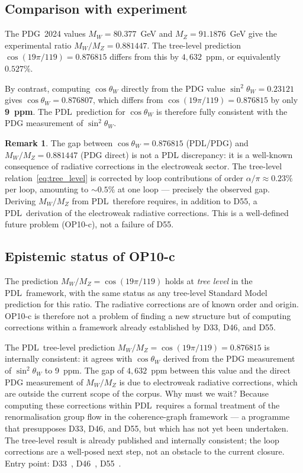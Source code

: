 \documentclass[12pt,a4paper]{article}
\newenvironment{waitbox}[1][]{%
  \begin{tcolorbox}[waitstyle,title={#1}]}{\end{tcolorbox}}
\theoremstyle{definition}
\newtheorem{remark}[theorem]{Remark}
\newcommand{\PDL}{\textsc{PDL}}
\newcommand{\thetaW}{\theta_W}
\newcommand{\sinW}{\sin^2\!\thetaW}
\begin{document}
\subsection{Comparison with experiment}

The PDG~2024 values $M_W = 80.377$~GeV and $M_Z = 91.1876$~GeV give the experimental ratio $M_W/M_Z = 0.881447$. The tree-level prediction $\cos(19\pi/119) = 0.876815$ differs from this by $4{,}632$~ppm, or equivalently $0.527\%$.

By contrast, computing $\cos\thetaW$ directly from the PDG value $\sinW = 0.23121$ gives $\cos\thetaW = 0.876807$, which differs from $\cos(19\pi/119) = 0.876815$ by only \textbf{9~ppm}. The \PDL\ prediction for $\cos\thetaW$ is therefore fully consistent with the PDG measurement of $\sinW$.

\begin{remark}
The gap between $\cos\thetaW = 0.876815$ (PDL/PDG) and $M_W/M_Z = 0.881447$ (PDG direct) is not a PDL discrepancy: it is a well-known consequence of radiative corrections in the electroweak sector. The tree-level relation~\eqref{eq:tree_level} is corrected by loop contributions of order $\alpha / \pi \approx 0.23\%$ per loop, amounting to $\sim 0.5\%$ at one loop --- precisely the observed gap. Deriving $M_W/M_Z$ from \PDL\ therefore requires, in addition to D55, a \PDL\ derivation of the electroweak radiative corrections. This is a well-defined future problem (OP10-c), not a failure of D55.
\end{remark}

\subsection{Epistemic status of OP10-c}

The prediction $M_W/M_Z = \cos(19\pi/119)$ holds at \emph{tree level} in the \PDL\ framework, with the same status as any tree-level Standard Model prediction for this ratio. The radiative corrections are of known order and origin. OP10-c is therefore not a problem of finding a new structure but of computing corrections within a framework already established by D33, D46, and D55.

\begin{waitbox}[OP10-c --- Epistemic status]
The \PDL\ tree-level prediction $M_W/M_Z = \cos(19\pi/119) = 0.876815$ is internally consistent: it agrees with $\cos\thetaW$ derived from the PDG measurement of $\sinW$ to 9~ppm. The gap of $4{,}632$~ppm between this value and the direct PDG measurement of $M_W/M_Z$ is due to electroweak radiative corrections, which are outside the current scope of the corpus. Why must we wait? Because computing these corrections within \PDL\ requires a formal treatment of the renormalisation group flow in the coherence-graph framework --- a programme that presupposes D33, D46, and D55, but which has not yet been undertaken. The tree-level result is already published and internally consistent; the loop corrections are a well-posed next step, not an obstacle to the current closure. Entry point: D33~\cite{PDL_D33}, D46~\cite{PDL_D46}, D55~\cite{PDL_D55}.
\end{waitbox}
\end{document}
